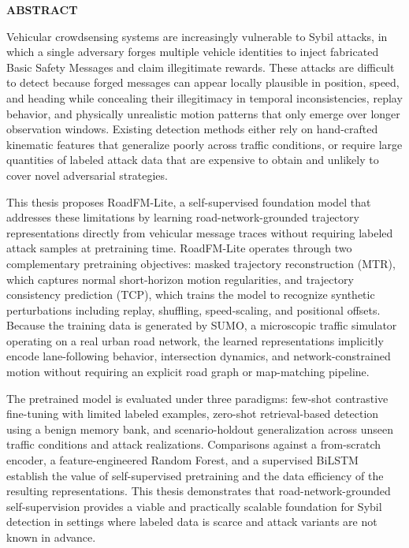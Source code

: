 \documentclass[12pt]{article}
\begin{document}
\clearpage
\hypersetup{pageanchor=true}
\setcounter{page}{1}

\begin{center}
\vspace*{0.25in}
{\bfseries ABSTRACT}\\[\baselineskip]
\end{center}
\vspace{\baselineskip}
\begingroup
\setlength{\parskip}{0.35em plus 0.08em minus 0.05em}
\setlength{\parindent}{0pt}
\justifying
Vehicular crowdsensing systems are increasingly vulnerable to Sybil attacks, in which a single adversary forges multiple vehicle identities to inject fabricated Basic Safety Messages and claim illegitimate rewards. These attacks are difficult to detect because forged messages can appear locally plausible in position, speed, and heading while concealing their illegitimacy in temporal inconsistencies, replay behavior, and physically unrealistic motion patterns that only emerge over longer observation windows. Existing detection methods either rely on hand-crafted kinematic features that generalize poorly across traffic conditions, or require large quantities of labeled attack data that are expensive to obtain and unlikely to cover novel adversarial strategies.

This thesis proposes RoadFM-Lite, a self-supervised foundation model that addresses these limitations by learning road-network-grounded trajectory representations directly from vehicular message traces without requiring labeled attack samples at pretraining time. RoadFM-Lite operates through two complementary pretraining objectives: masked trajectory reconstruction (MTR), which captures normal short-horizon motion regularities, and trajectory consistency prediction (TCP), which trains the model to recognize synthetic perturbations including replay, shuffling, speed-scaling, and positional offsets. Because the training data is generated by SUMO, a microscopic traffic simulator operating on a real urban road network, the learned representations implicitly encode lane-following behavior, intersection dynamics, and network-constrained motion without requiring an explicit road graph or map-matching pipeline.

The pretrained model is evaluated under three paradigms: few-shot contrastive fine-tuning with limited labeled examples, zero-shot retrieval-based detection using a benign memory bank, and scenario-holdout generalization across unseen traffic conditions and attack realizations. Comparisons against a from-scratch encoder, a feature-engineered Random Forest, and a supervised BiLSTM establish the value of self-supervised pretraining and the data efficiency of the resulting representations. This thesis demonstrates that road-network-grounded self-supervision provides a viable and practically scalable foundation for Sybil detection in settings where labeled data is scarce and attack variants are not known in advance.
\end{document}

